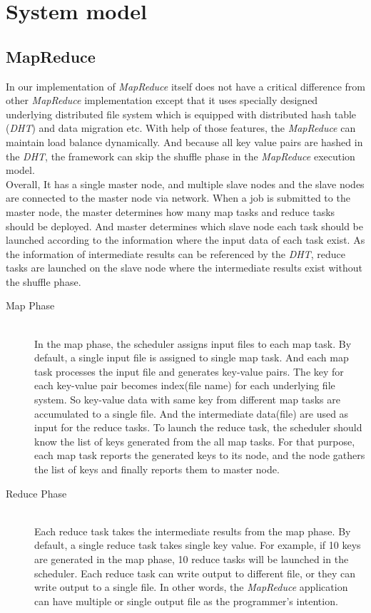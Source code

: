 \section*{System model}
\subsection*{MapReduce}
In our implementation of \textit{MapReduce} itself does not have a critical difference from other \textit{MapReduce}
implementation except that it uses specially designed underlying distributed file system which
is equipped with distributed hash table (\textit{DHT}) and data migration etc. With help of those features,
the \textit{MapReduce} can maintain load balance dynamically. And because all key value pairs are hashed
in the \textit{DHT}, the framework can skip the shuffle phase in the \textit{MapReduce} execution model. \\

Overall, It has a single master node, and multiple slave nodes and the slave nodes are connected
to the master node via network. When a job is submitted to the master node, the master determines
how many map tasks and reduce tasks should be deployed. And master determines which slave node
each task should be launched according to the information where the input data of each task
exist. As the information of intermediate results can be referenced by the \textit{DHT}, reduce tasks
are launched on the slave node where the intermediate results exist without the shuffle phase.

\begin{description}
\item[Map Phase] \hfill \\
In the map phase, the scheduler assigns input files to each map task. By default,
a single input file is assigned to single map task. And each map task processes the input file and generates key-value pairs. 
The key for each key-value pair becomes index(file name) for each underlying file system. So key-value data with same key from 
different map tasks are accumulated to a single file. And the intermediate data(file) are used as input for the reduce tasks.
To launch the reduce task, the scheduler should know the list of keys generated from the all map tasks. 
For that purpose, each map task reports the generated keys to its node, and the node gathers the list of keys and finally reports them to master node.

\item[Reduce Phase] \hfill \\
Each reduce task takes the intermediate results from the map phase. By default, a single reduce 
task takes single key value. For example, if 10 keys are generated in the map phase, 10 reduce 
tasks will be launched in the scheduler. Each reduce task can write output to different file, 
or they can write output to a single file. In other words, the \textit{MapReduce} application can have 
multiple or single output file as the programmer’s intention.
\end{description}

